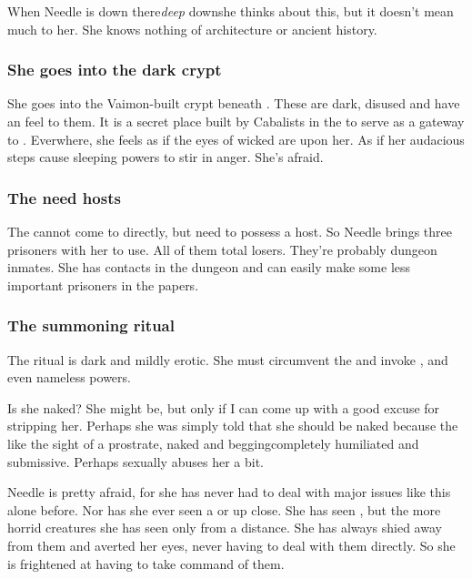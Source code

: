 When Needle is down there\dash \emph{deep} down\dash she thinks about this, but it doesn't mean much to her. 
She knows nothing of architecture or ancient history. 





\subsubsection{She goes into the dark crypt}
She goes into the Vaimon-built crypt beneath \CastlePelidor. 
These are dark, disused and have an  feel to them. 
It is a secret place built by Cabalists in the \VaimonCaliphate to serve as a gateway to \Nyx. 
Everwhere, she feels as if the eyes of wicked \Qliphoth{} are upon her. 
As if her audacious steps cause sleeping powers to stir in anger. 
She's afraid. 





\subsubsection{The \banes{} need \human{} hosts}
The \banes{} cannot come to \Miith{} directly, but need to possess a \human{} host. 
So Needle brings three prisoners with her to use. 
All of them total losers. 
They're probably dungeon inmates. 
She has contacts in the dungeon and can easily make some less important prisoners  in the papers. 





\subsubsection{The summoning ritual}
The ritual is dark and mildly erotic. 
She must circumvent the \Sephiroth{} and invoke \Qliphoth{}, and even nameless powers. 

Is she naked? 
She might be, but only if I can come up with a good excuse for stripping her. 
Perhaps she was simply told that she should be naked because the \resphain{} like the sight of a \human{} prostrate, naked and begging\dash completely humiliated and submissive. 
Perhaps \Achsah{} sexually abuses her a bit. 

Needle is pretty afraid, for she has never had to deal with major issues like this alone before. 
Nor has she ever seen a \bane{} or \banerat{} up close. 
She has seen \resphain, but the more horrid creatures she has seen only from a distance. 
She has always shied away from them and averted her eyes, never having to deal with them directly. So she is frightened at having to take command of them. 

